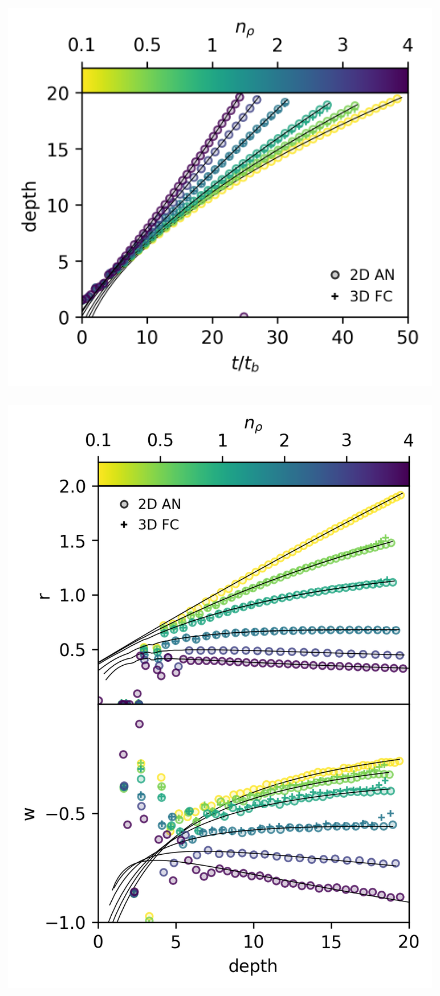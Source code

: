 \documentclass[twocolumn, amsmath, amsfonts, amssymb, trackchanges]{aastex62}
\begin{document}
\begin{figure}[t!]
    \includegraphics[width=\columnwidth]{results_panels_d_v_t.png}
    \caption{
    \label{fig:results_d_v_t} }
\end{figure}

\begin{figure}[t!]
    \includegraphics[width=\columnwidth]{results_panels_vs_depth.png}
    \caption{
    \label{fig:results_vs_depth} }
\end{figure}
\end{document}
